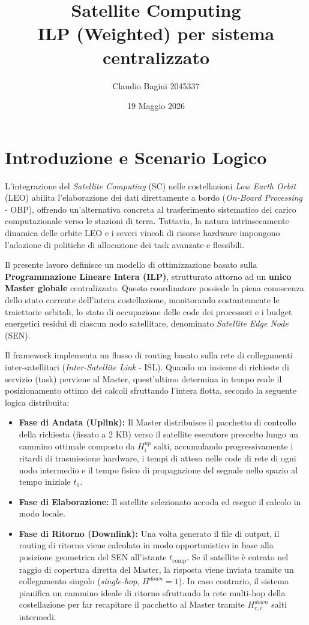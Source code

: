 \documentclass[12pt]{article}
\title{
\textbf{Satellite Computing} \\[0.5em]
\textbf{ILP (Weighted) per sistema centralizzato} \\[1em]
}
\author{Claudio Bagini 2045337}
\date{19 Maggio 2026}
\begin{document}
\maketitle
\section{Introduzione e Scenario Logico}
L'integrazione del \textit{Satellite Computing} (SC) nelle costellazioni \textit{Low Earth Orbit} (LEO) abilita l'elaborazione dei dati direttamente a bordo (\textit{On-Board Processing} - OBP), offrendo un'alternativa concreta al trasferimento sistematico del carico computazionale verso le stazioni di terra. Tuttavia, la natura intrinsecamente dinamica delle orbite LEO e i severi vincoli di risorse hardware impongono l'adozione di politiche di allocazione dei task avanzate e flessibili.

Il presente lavoro definisce un modello di ottimizzazione basato sulla \textbf{Programmazione Lineare Intera (ILP)}, strutturato attorno ad un \textbf{unico Master globale} centralizzato. Questo coordinatore possiede la piena conoscenza dello stato corrente dell'intera costellazione, monitorando costantemente le traiettorie orbitali, lo stato di occupazione delle code dei processori e i budget energetici residui di ciascun nodo satellitare, denominato \textit{Satellite Edge Node} (SEN). 

Il framework implementa un flusso di routing basato sulla rete di collegamenti inter-satellitari (\textit{Inter-Satellite Link} - ISL). Quando un insieme di richieste di servizio (task) perviene al Master, quest'ultimo determina in tempo reale il posizionamento ottimo dei calcoli sfruttando l'intera flotta, secondo la seguente logica distribuita:
\begin{itemize}
    \item \textbf{Fase di Andata (Uplink):} Il Master distribuisce il pacchetto di controllo della richiesta (fissato a 2 KB) verso il satellite esecutore prescelto lungo un cammino ottimale composto da $H_i^{up}$ salti, accumulando progressivamente i ritardi di trasmissione hardware, i tempi di attesa nelle code di rete di ogni nodo intermedio e il tempo fisico di propagazione del segnale nello spazio al tempo iniziale $t_0$.
    \item \textbf{Fase di Elaborazione:} Il satellite selezionato accoda ed esegue il calcolo in modo locale.
    \item \textbf{Fase di Ritorno (Downlink):} Una volta generato il file di output, il routing di ritorno viene calcolato in modo opportunistico in base alla posizione geometrica del SEN all'istante $t_{\text{comp}}$. Se il satellite \`e entrato nel raggio di copertura diretta del Master, la risposta viene inviata tramite un collegamento singolo (\textit{single-hop}, $H^{down} = 1$). In caso contrario, il sistema pianifica un cammino ideale di ritorno sfruttando la rete multi-hop della costellazione per far recapitare il pacchetto al Master tramite $H_{r,i}^{down}$ salti intermedi.
\end{itemize}
\end{document}
